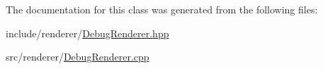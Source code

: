 The documentation for this class was generated from the following files\-:\begin{DoxyCompactItemize}
\item 
include/renderer/\hyperlink{DebugRenderer_8hpp}{Debug\-Renderer.\-hpp}\item 
src/renderer/\hyperlink{DebugRenderer_8cpp}{Debug\-Renderer.\-cpp}\end{DoxyCompactItemize}
